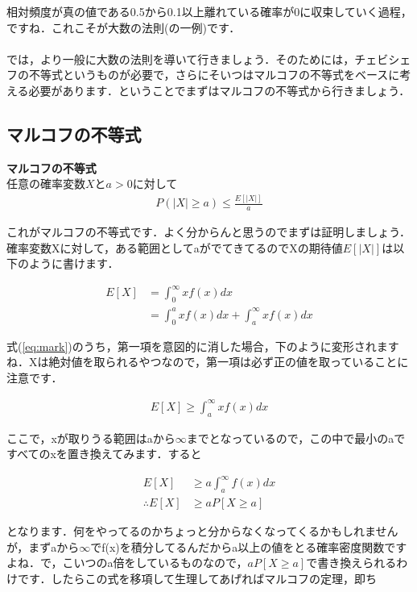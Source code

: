 \documentclass[11pt,a4paper,uplatex]{ujreport} 	%
\begin{document}
相対頻度が真の値である0.5から0.1以上離れている確率が0に収束していく過程，ですね．これこそが大数の法則(の一例)です．\\\\

では，より一般に大数の法則を導いて行きましょう．そのためには，チェビシェフの不等式というものが必要で，さらにそいつはマルコフの不等式をベースに考える必要があります．ということでまずはマルコフの不等式から行きましょう．

\subsection{マルコフの不等式}

\begin{screen}
  \textbf{マルコフの不等式}\\
  任意の確率変数$X$と$a>0$に対して
  \begin{align}
    P(|X| \geq a) \leq \frac{E[|X|]}{a}
  \end{align}
\end{screen}

これがマルコフの不等式です．よく分からんと思うのでまずは証明しましょう．確率変数Xに対して，ある範囲としてaがでてきてるのでXの期待値$E[|X|]$は以下のように書けます．

\begin{align}
  E[X] &= \int_0^\infty xf(x)dx \nonumber \\
  &= \int_0^a xf(x)dx + \int_a^\infty x f(x)dx
  \label{eq:mark}
\end{align}

式(\ref{eq:mark})のうち，第一項を意図的に消した場合，下のように変形されますね．Xは絶対値を取られるやつなので，第一項は必ず正の値を取っていることに注意です．

\begin{align}
  E[X] \geq \int_a^\infty x f(x)dx
\end{align}

ここで，xが取りうる範囲はaから$\infty$までとなっているので，この中で最小のaですべてのxを置き換えてみます．すると

\begin{align}
  E[X] &\geq a\int_a^\infty f(x)dx\\
  \therefore E[X] &\geq aP[X\geq a]
\end{align}

となります．何をやってるのかちょっと分からなくなってくるかもしれませんが，まずaから$\infty$でf(x)を積分してるんだからa以上の値をとる確率密度関数ですよね．で，こいつのa倍をしているものなので，$aP[X\geq a]$で書き換えられるわけです．したらこの式を移項して生理してあげればマルコフの定理，即ち
\end{document}
